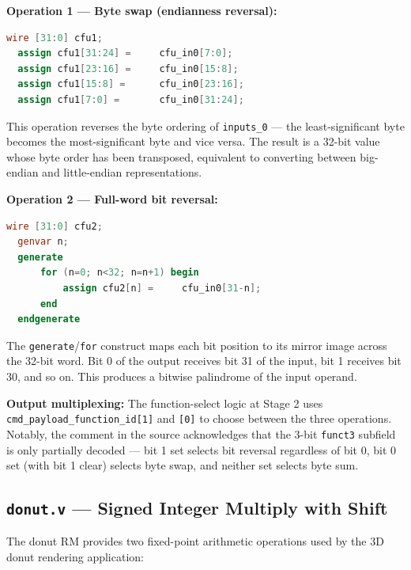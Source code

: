 \textbf{Operation 1 — Byte swap (endianness reversal):}

\begin{lstlisting}[style=mystyle, language=Verilog]
  wire [31:0] cfu1;
  assign cfu1[31:24] =     cfu_in0[7:0];
  assign cfu1[23:16] =     cfu_in0[15:8];
  assign cfu1[15:8] =      cfu_in0[23:16];
  assign cfu1[7:0] =       cfu_in0[31:24];
\end{lstlisting}

This operation reverses the byte ordering of \texttt{inputs\_0} — the least-significant byte becomes the most-significant byte and vice versa. The result is a 32-bit value whose byte order has been transposed, equivalent to converting between big-endian and little-endian representations.

\textbf{Operation 2 — Full-word bit reversal:}

\begin{lstlisting}[style=mystyle, language=Verilog]
  wire [31:0] cfu2;
  genvar n;
  generate
      for (n=0; n<32; n=n+1) begin
          assign cfu2[n] =     cfu_in0[31-n];
      end
  endgenerate
\end{lstlisting}

The \texttt{generate}/\texttt{for} construct maps each bit position to its mirror image across the 32-bit word. Bit 0 of the output receives bit 31 of the input, bit 1 receives bit 30, and so on. This produces a bitwise palindrome of the input operand.

\textbf{Output multiplexing:} The function-select logic at Stage 2 uses \texttt{cmd\_payload\_function\_id[1]} and \texttt{[0]} to choose between the three operations. Notably, the comment in the source acknowledges that the 3-bit \texttt{funct3} subfield is only partially decoded — bit 1 set selects bit reversal regardless of bit 0, bit 0 set (with bit 1 clear) selects byte swap, and neither set selects byte sum.

\subsection{\texttt{donut.v} — Signed Integer Multiply with Shift}

The donut RM provides two fixed-point arithmetic operations used by the 3D donut rendering application:

